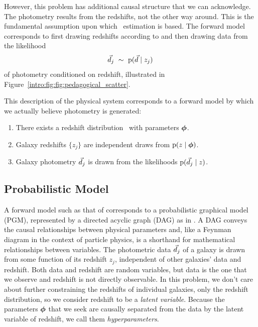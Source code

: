 However, this problem has additional causal structure that we can acknowledge.
The photometry results from the redshifts, not the other way around.
This is the fundamental assumption upon which \pz\ estimation is based.
The forward model corresponds to first drawing redshifts according to  and then drawing data from the likelihood
\begin{equation}
\eqlabel{eqn:pzpdf}
\data_{j}\ \sim\ \pr{\data \gvn z_{j}}
\end{equation}
of photometry conditioned on redshift, illustrated in Figure~\ref{intro:fig:fig:pedagogical_scatter}.

This description of the physical system corresponds to a forward model by which we actually believe photometry is generated:
\begin{enumerate}
	\item There exists a redshift distribution \nz\ with parameters ${\boldsymbol{\phi}}$.
	\item Galaxy redshifts $\{z_{j}\}$ are independent draws from $\mathrm{p}(z \mid {\ensuremath{\boldsymbol{\phi}}})$.
	\item Galaxy photometry $\vec{d}_{j}$ is drawn from the likelihoods $\mathrm{p}(\vec{d}_{j} \mid z)$.
\end{enumerate}

\subsection{Probabilistic Model}

A forward model such as that of  corresponds to a probabilistic graphical model (PGM), represented by a directed acyclic graph (DAG) as in .
A DAG conveys the causal relationships between physical parameters and, like a Feynman diagram in the context of particle physics, is a shorthand for mathematical relationships between variables.
The photometric data $\vec{d}_{j}$ of a galaxy is drawn from some function of its redshift $z_{j}$, independent of other galaxies' data and redshift.
Both data and redshift are random variables, but data is the one that we observe and redshift is not directly observable.
In this problem, we don't care about further constraining the redshifts of individual galaxies, only the redshift distribution, so we consider redshift to be a \textit{latent variable}.
Because the parameters ${\boldsymbol{\phi}}$ that we seek are causally separated from the data by the latent variable of redshift, we call them \textit{hyperparameters}.

